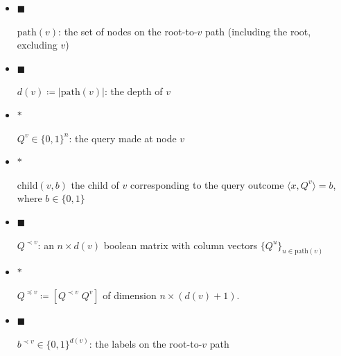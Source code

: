 \begin{itemize}


\item[] 
$\blacksquare$ 


$\mathrm{path}(v)$: the set of nodes on the root-to-$v$ path (including the root, excluding $v$)\par





\item[] 
$\blacksquare$ 


$d(v)\coloneqq|\mathrm{path}(v)|$: the depth of $v$\par





\item[] 
$\bm{*}$ 


$Q^{v}\in\{0,1\}^{n}$: the query made at node $v$\par





\item[] 
$\bm{*}$ 


$\mathrm{child}(v,b)$ the child of $v$ corresponding to the query outcome $\langle x,Q^{v}\rangle=b$, where $b\in\{0,1\}$\par





\item[] 
$\blacksquare$ 


$Q^{\prec v}$: an $n\times d(v)$ boolean matrix with column vectors $\{Q^{u}\}_{u\in\mathrm{path}(v)}$\par





\item[] 
$\bm{*}$ 


$Q^{\preceq v}\coloneqq[Q^{\prec v}\;Q^{v}]$ of dimension $n\times(d(v)+1)$.\par





\item[] 
$\blacksquare$ 


$b^{\prec v}\in\{0,1\}^{d(v)}$: the labels on the root-to-$v$ path\par





\end{itemize}


